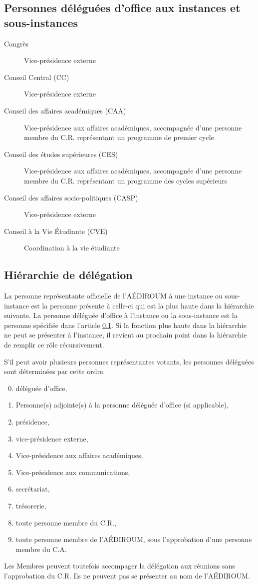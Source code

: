 \documentclass{aediroum}
\newcommand{\article}[1]{article \ref{#1}}
\begin{document}
\subsection{Personnes déléguées
d’office aux instances et sous-instances}\label{sec:delegues-doffice-instances}
\begin{description}
\item[Congrès] Vice-présidence externe
\item[Conseil Central (CC)] Vice-présidence externe
\item[Conseil des affaires académiques (CAA)] Vice-présidence aux affaires académiques, accompagnée d’une personne membre du C.R. représentant
un programme de premier cycle
\item[Conseil des études supérieures (CES)] Vice-présidence aux affaires académiques, accompagnée
d’une personne membre du C.R. représentant un programme des cycles supérieurs
\item[Conseil des affaires socio-politiques (CASP)] Vice-présidence externe
\item[Conseil à la Vie Étudiante (CVE)] Coordination à la vie étudiante
\end{description}

\subsection{Hiérarchie de délégation}\label{sec:hierarchie-delegues-faecum}

La personne représentante officielle de l'AÉDIROUM à une instance ou sous-instance est la personne présente à celle-ci qui est la plus haute dans la hiérarchie suivante. La personne déléguée d'office à l'instance ou la sous-instance est la personne spécifiée dans l'\article{sec:delegues-doffice-instances}. Si la fonction plus haute dans la hiérarchie ne peut se présenter à l'instance, il revient au prochain point dans la hiérarchie de remplir ce rôle récursivement.

S'il peut avoir plusieurs personnes représentantes votants, les personnes déléguées sont déterminées par cette ordre.

\begin{enumerate}\setcounter{enumi}{-1}
\item déléguée d'office,
\item Personne(s) adjointe(s) à la personne déléguée d’office (si applicable),
\item présidence,
\item vice-présidence externe,
\item Vice-présidence aux affaires académiques,
\item Vice-présidence aux communications,
\item secrétariat,
\item trésorerie,
\item toute personne membre du C.R.,
\item toute personne membre de l'AÉDIROUM, sous l'approbation d'une personne membre du C.A.
\end{enumerate}

Les Membres peuvent toutefois accompager la délégation aux réunions sans l'approbation du C.R. Ils ne peuvent pas se présenter au nom de l'AÉDIROUM.
\end{document}
